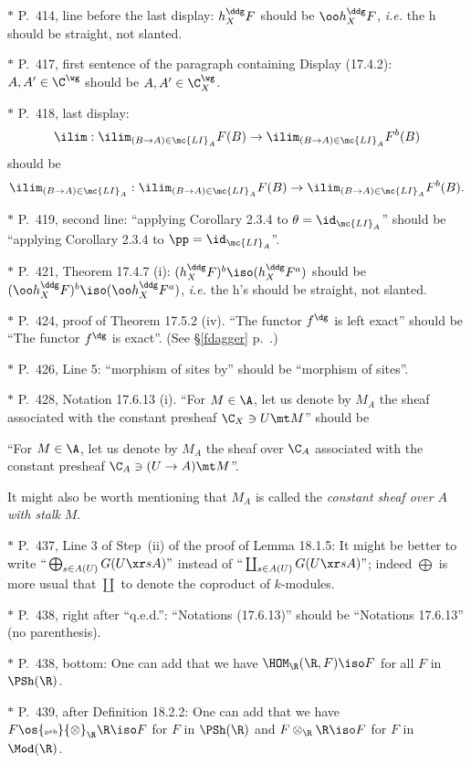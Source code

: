 \documentclass[12pt]{article}
\theoremstyle{remark}
\theoremstyle{definition}
\begin{document}
\nn$*$ P.~414, line before the last display: $h_X^\ddg F$ should be $\oo h_X^\ddg F$, \emph{i.e.} the h should be straight, not slanted. 

\nn$*$ P.~417, first sentence of the paragraph containing Display (17.4.2): $A,A'\in\C^\wg$ should be $A,A'\in\C_X^\wg$. 

\nn$*$ P.~418, last display: 
$$
\ilim:\ilim_{(B\to A)\in\mc{LI}_A}F(B)\to\ilim_{(B\to A)\in\mc{LI}_A}F^b(B)
$$ 
should be 
$$
\ilim_{(B\to A)\in\mc{LI}_A}:\ilim_{(B\to A)\in\mc{LI}_A}F(B)\to\ilim_{(B\to A)\in\mc{LI}_A}F^b(B).
$$

\nn$*$ P.~419, second line: ``applying Corollary 2.3.4 to $\theta=\id_{\mc{LI}_A}$'' should be ``applying Corollary 2.3.4 to $\pp=\id_{\mc{LI}_A}$''.

\nn$*$ P.~421, Theorem 17.4.7 (i): $(h_X^\ddg F)^b\iso(h_X^\ddg F^a)$ should be $(\oo h_X^\ddg F)^b\iso(\oo h_X^\ddg F^a)$, \emph{i.e.} the h's should be straight, not slanted.

\nn$*$ P.~424, proof of Theorem 17.5.2 (iv). ``The functor $f^\dg$ is left exact'' should be ``The functor $f^\dg$ is exact''. (See \S\ref{fdagger} p.~.) 

\nn$*$ P.~426, Line 5: ``morphism of sites by'' should be ``morphism of sites''.

\nn$*$ P.~428, Notation 17.6.13 (i). ``For $M\in\A$, let us denote by $M_A$ the sheaf associated with the constant presheaf $\C_X\ni U\mt M$'' should be  

``For $M\in\A$, let us denote by $M_A$ the sheaf over $\C_A$ associated with the constant presheaf $\C_A\ni(U\to A)\mt M$''. 

It might also be worth mentioning that $M_A$ is called the \emph{constant sheaf over $A$ with stalk} $M$. 

\nn$*$ P.~437, Line 3 of Step~(ii) of the proof of Lemma 18.1.5: It might be better to write $``\bigoplus_{s\in A(U)}G(U\xr sA)"$ instead of $``\coprod_{s\in A(U)}G(U\xr sA)"$; indeed $\bigoplus$ is more usual that $\coprod$ to denote the coproduct of $k$-modules. 

\nn$*$ P.~438, right after ``q.e.d.'': ``Notations (17.6.13)'' should be ``Notations 17.6.13'' (no parenthesis). 

\nn$*$ P.~438, bottom: One can add that we have $\HOM_\R(\R,F)\iso F$ for all $F$ in $\PSh(\R)$. 

\nn$*$ P.~439, after Definition 18.2.2: One can add that we have $F\os{\text{\tiny psh}}{\otimes}_\R\R\iso F$ for $F$ in $\PSh(\R)$ and $F\otimes_\R\R\iso F$ for $F$ in $\Mod(\R)$. 
\end{document}
